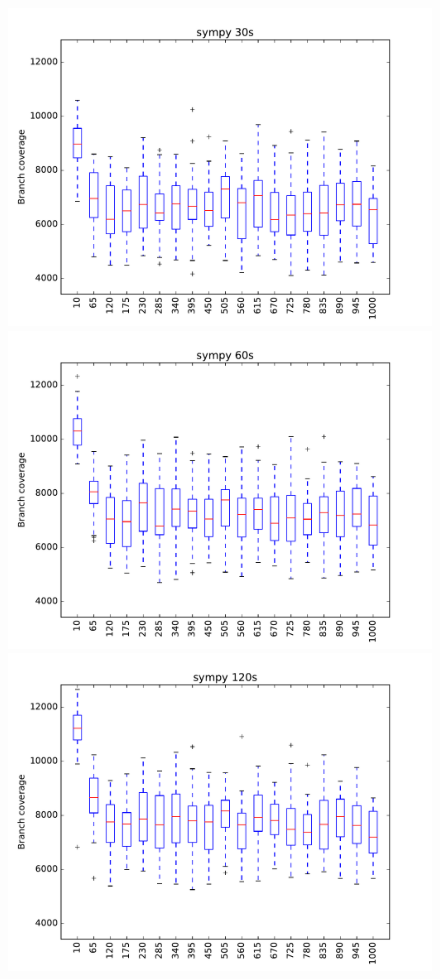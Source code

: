 \begin{figure}
\includegraphics[width=\columnwidth]{graphs/sympyrand30}
\includegraphics[width=\columnwidth]{graphs/sympyrand60}
\includegraphics[width=\columnwidth]{graphs/sympyrand120}
\end{figure}

